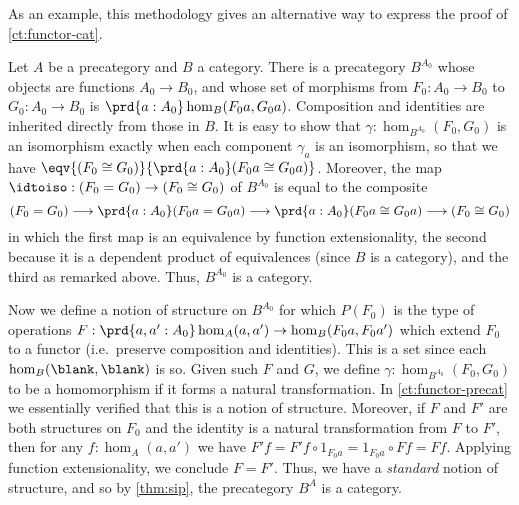 As an example, this methodology gives an alternative way to express the proof of \cref{ct:functor-cat}.

\begin{eg}\label{ct:sip-functor-cat}
  Let $A$ be a precategory and $B$ a category.
  There is a precategory $B^{A_0}$ whose objects are functions $A_0 \to B_0$, and whose set of morphisms from $F_0:A_0 \to B_0$ to $G_0:A_0 \to B_0$ is $\prd{a:A_0} \hom_B(F_0 a, G_0 a)$.
  Composition and identities are inherited directly from those in $B$.
  It is easy to show that $\gamma:\hom_{B^{A_0}}(F_0, G_0)$ is an isomorphism exactly when each component $\gamma_a$ is an isomorphism, so that we have $\eqv{(F_0 \cong G_0)}{\prd{a:A_0} (F_0 a \cong G_0 a)}$.
  Moreover, the map $\idtoiso : (F_0 = G_0) \to (F_0 \cong G_0)$ of $B^{A_0}$ is equal to the composite
  \[ (F_0 = G_0) \longrightarrow \prd{a:A_0} (F_0 a  = G_0 a) \longrightarrow \prd{a:A_0} (F_0 a \cong G_0 a) \longrightarrow (F_0 \cong G_0) \]
  in which the first map is an equivalence by function extensionality, the second because it is a dependent product of equivalences (since $B$ is a category), and the third as remarked above.
  Thus, $B^{A_0}$ is a category.

  Now we define a notion of structure on $B^{A_0}$ for which $P(F_0)$ is the type of operations $F:\prd{a,a':A_0} \hom_A(a,a') \to \hom_B(F_0 a,F_0 a')$ which extend $F_0$ to a functor (i.e.\ preserve composition and identities).
  This is a set since each $\hom_B(\blank,\blank)$ is so.
  Given such $F$ and $G$, we define $\gamma:\hom_{B^{A_0}}(F_0, G_0)$ to be a homomorphism if it forms a natural transformation.
  In \cref{ct:functor-precat} we essentially verified that this is a notion of structure.
  Moreover, if $F$ and $F'$ are both structures on $F_0$ and the identity is a natural transformation from $F$ to $F'$, then for any $f:\hom_A(a,a')$ we have $F'f = F'f \circ 1_{F_0 a} = 1_{F_0 a}\circ F f = F f$.
  Applying function extensionality, we conclude $F = F'$.
  Thus, we have a \emph{standard} notion of structure, and so by \cref{thm:sip}, the precategory $B^A$ is a category.
\end{eg}

